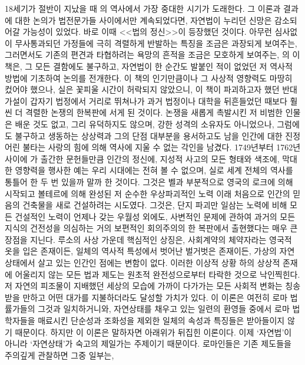 18세기가 절반이 지났을 때 의 역사에서 가장 중대한 시기가 도래한다.
그 이론과 결과에 대한 논의가 법전문가들 사이에서만 계속되었다면,
자연법이 누리던 신망은 감소되어갈 가능성이 있었다.
바로 이때 <<법의 정신>>이 등장했던 것이다.
아무런 심사없이 무사통과되던 가정들에 극히 격렬하게 반발하는
특징을 조금은 과장되게 보여주는,
그러면서도 기존의 편견과 타협하려는 욕망의 흔적을
조금은 모호하게 보여주는,
의 이 책은,
그 모든 결함에도 불구하고,
자연법이 한 순간도 발붙인 적이 없었던 저 역사적 방법에
기초하여 논의를 전개한다.
이 책의 인기만큼이나 그 사상적 영향력도 마땅히 컸어야 했으나,
실은 꽃피울 시간이 허락되지 않았으니,
이 책이 파괴하고자 했던 반대가설이 갑자기 법정에서 거리로 뛰쳐나가
과거 법정이나 대학을 뒤흔들었던 때보다 훨씬 더 격렬한 논쟁의
한복판에 서게 된 것이다.
논쟁을 새롭게 촉발시킨 저 비범한 인물은
배운 것도 없고, 그리 유덕하지도 않으며, 강한 성격의 소유자도 아니었으나,
그럼에도 불구하고 생동하는 상상력과
그의 단점 대부분을 용서하고도 남을
인간에 대한 진정어린 불타는 사랑의 힘에 의해
역사에 지울 수 없는 각인을 남겼다.
1749년부터 1762년 사이에 가 출간한 문헌들만큼
인간의 정신에, 지성적 사고의 모든 형태와 색조에,
막대한 영향력을 행사한 예는
우리 시대에는 전혀 볼 수 없으며, 실로 세계 전체의 역사를 통틀어 한 두 번
있을까 말까 한 것이다.
그것은 벨과
부분적으로 영국의 로크에 의해
시작되고 볼테르에 의해 완성된 저 순수한 우상파괴적인 노력 이래
처음으로 인간의 믿음의 건축물을 새로 건설하려는 시도였다.
그것은, 단지 파괴만 일삼는 노력에 비해 모든 건설적인 노력이
언제나 갖는 우월성 외에도,
사변적인 문제에 관하여 과거의 모든 지식의 건전성을 의심하는
거의 보편적인 회의주의의 한 복판에서 출현했다는 매우 큰 장점을 지닌다.
루소의 사상 가운데 핵심적인 상징은,
사회계약의 체약자라는 영국적 옷을 입은 존재이든,
일체의 역사적 특성에서 벗어난 벌거벗은 존재이든,
가상의 자연상태에서 살고 있는 인간인 점에는 변함이 없다.
이러한 이상적 상황 하의 상상적 존재에 어울리지 않는
모든 법과 제도는 원초적 완전성으로부터 타락한 것으로 낙인찍힌다.
저 자연의 피조물이 지배했던 세상의 모습에 가까이 다가가는 모든 사회적 변화는
칭송받을 만하고 어떤 대가를 지불하더라도 달성할 가치가 있다.
이 이론은 여전히 로마 법률가들의 그것과 일치하거니와,
자연상태를 채우고 있는 일련의 환영들 중에서
로마 법학자들을 매료시킨 단순성과 조화성을 제외한 일체의
속성과 특징들은 받아들이지 않기 때문이다.
하지만 이 이론은 말하자면 아래위가 뒤집힌 이론이다.
이제 `자연법'이 아니라 `자연상태'가 숙고의 제일가는 주제이기 때문이다.
로마인들은 기존 제도들을 주의깊게 관찰하면 그중 일부는,
